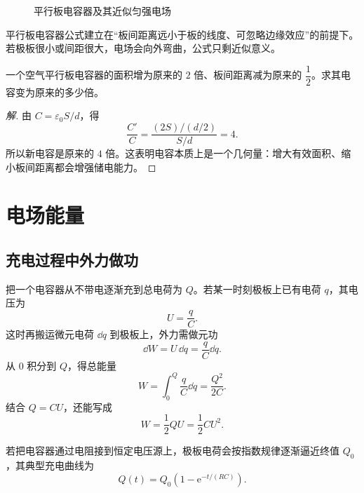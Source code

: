\begin{figure}[H]
\centering
{}
\caption{平行板电容器及其近似匀强电场}
\end{figure}

\begin{remark}
平行板电容器公式建立在“板间距离远小于板的线度、可忽略边缘效应”的前提下。若极板很小或间距很大，电场会向外弯曲，公式只剩近似意义。
\end{remark}

\begin{example}
一个空气平行板电容器的面积增为原来的 $2$ 倍、板间距离减为原来的 $\dfrac{1}{2}$。求其电容变为原来的多少倍。
\end{example}

\begin{proof}[解]
由 $C=\varepsilon_0 S/d$，得
\[
\frac{C'}{C}=\frac{(2S)/(d/2)}{S/d}=4.
\]
所以新电容是原来的 $4$ 倍。这表明电容本质上是一个几何量：增大有效面积、缩小板间距离都会增强储电能力。
\end{proof}

\section{电场能量}

\subsection{充电过程中外力做功}

把一个电容器从不带电逐渐充到总电荷为 $Q$。若某一时刻极板上已有电荷 $q$，其电压为
\[
U=\frac{q}{C}.
\]
这时再搬运微元电荷 $\dd q$ 到极板上，外力需做元功
\[
\dd W=U\,\dd q=\frac{q}{C}\dd q.
\]
从 $0$ 积分到 $Q$，得总能量
\[
W=\int_0^Q \frac{q}{C}\dd q=\frac{Q^2}{2C}.
\]
结合 $Q=CU$，还能写成
\[
W=\frac{1}{2}QU=\frac{1}{2}CU^2.
\]

若把电容器通过电阻接到恒定电压源上，极板电荷会按指数规律逐渐逼近终值 $Q_0$，其典型充电曲线为
\[
Q(t)=Q_0\left(1-\mathrm{e}^{-t/(RC)}\right).
\]

